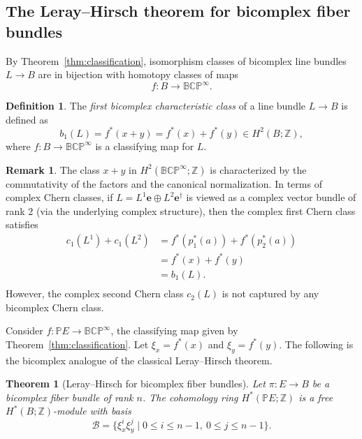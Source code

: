 \documentclass[11pt]{amsart}
\newcommand{\Z}{\mathbb{Z}}
\renewcommand{\P}{\mathbb{P}}
\newcommand{\e}{\mathbf{e}}          %
\newcommand{\ed}{\mathbf{e}^\dagger} %
\newcommand{\wb}{b}
\newcommand{\BCP}{\mathbb{BCP}}
\newtheorem{thm}[prop]{Theorem}
\theoremstyle{definition}
\newtheorem{defn}[prop]{Definition}       %
\newtheorem{remark}[prop]{Remark}            %
\begin{document}
\subsection{The Leray--Hirsch theorem for bicomplex fiber bundles}


By Theorem~\ref{thm:classification}, isomorphism classes of bicomplex line bundles $L \to B$ are in bijection with homotopy classes of maps
\begin{equation*}
    f: B \to \BCP^\infty.
\end{equation*}

\begin{defn}
    The \emph{first bicomplex characteristic class} of a line bundle $L \to B$ is defined as
    \begin{equation}
        \wb_1(L) = f^*(x + y) = f^*(x) + f^*(y) \in H^2(B;\Z),
    \end{equation}
    where $f: B \to \BCP^\infty$ is a classifying map for $L$.
\end{defn}

\begin{remark}
    The class $x + y$ in $H^2(\BCP^\infty;\Z)$ is characterized by the commutativity of the factors and the canonical normalization. In terms of complex Chern classes, if $L = L^{1}\e \oplus L^{2}\ed$ is viewed as a complex vector bundle of rank $2$ (via the underlying complex structure), then the complex first Chern class satisfies
    \begin{align*}
        c_1(L^{1}) + c_{1}(L^{2}) &=
        f^*(p_1^*(a)) + f^*(p_2^*(a))\\
        &=f^*(x) + f^*(y)\\
        &=\wb_1(L).\\
    \end{align*}
     However, the complex second Chern class $c_2(L)$ is not captured by any bicomplex Chern class.
\end{remark}

Consider $f:\P E\to \BCP^\infty$, the classifying map given by Theorem~\ref{thm:classification}. Let $\xi_x = f^*(x)$ and $\xi_y = f^*(y)$. The following is the bicomplex analogue of the classical Leray--Hirsch theorem.

\begin{thm}[Leray--Hirsch for bicomplex fiber bundles]\label{thm:leray_hirsch}
    Let $\pi:E \to B$ be a bicomplex fiber bundle of rank $n$. The cohomology ring $H^*(\P E;\Z)$ is a free $H^*(B;\Z)$-module with basis
    \begin{equation}\label{eq:basis}
        \mathcal{B} = \{ \xi_x^i \xi_y^j \mid 0 \le i \le n-1,\ 0 \le j \le n-1 \}.
    \end{equation}
\end{thm}
\end{document}

